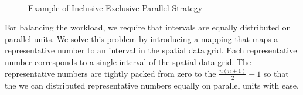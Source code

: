 \documentclass[AMA,LATO1COL]{WileyNJD-v2}
\begin{document}
\begin{figure}[t]
\centering
{}
~~\\
\caption{Example of Inclusive Exclusive Parallel Strategy\label{inex1d}}
\end{figure}
For balancing the workload, we require that intervals are equally distributed on parallel units. We solve this problem by introducing a mapping that maps a representative number to an interval in the spatial data grid. Each representative number corresponds to a single interval of the spatial data grid. The representative numbers are tightly packed from zero to the $\frac{n(n+1)}{2}-1$ so that the we can distributed representative numbers equally on parallel units with ease.
\end{document}
